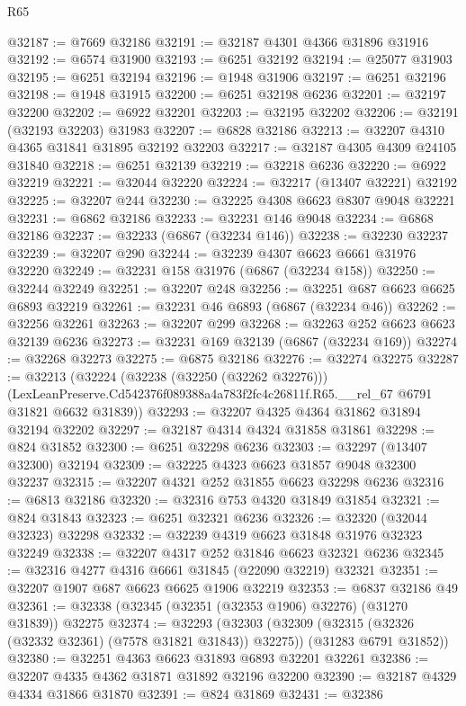 \begin{lexlean}{R65}
\begin{coremodule}
{@32187 := @7669 @32186
@32191 := @32187 @4301 @4366 @31896 @31916
@32192 := @6574 @31900
@32193 := @6251 @32192
@32194 := @25077 @31903
@32195 := @6251 @32194
@32196 := @1948 @31906
@32197 := @6251 @32196
@32198 := @1948 @31915
@32200 := @6251 @32198 @6236
@32201 := @32197 @32200
@32202 := @6922 @32201
@32203 := @32195 @32202
@32206 := @32191 (@32193 @32203) @31983
@32207 := @6828 @32186
@32213 := @32207 @4310 @4365 @31841 @31895 @32192 @32203
@32217 := @32187 @4305 @4309 @24105 @31840
@32218 := @6251 @32139
@32219 := @32218 @6236
@32220 := @6922 @32219
@32221 := @32044 @32220
@32224 := @32217 (@13407 @32221) @32192
@32225 := @32207 @244
@32230 := @32225 @4308 @6623 @8307 @9048 @32221
@32231 := @6862 @32186
@32233 := @32231 @146 @9048
@32234 := @6868 @32186
@32237 := @32233 (@6867 (@32234 @146))
@32238 := @32230 @32237
@32239 := @32207 @290
@32244 := @32239 @4307 @6623 @6661 @31976 @32220
@32249 := @32231 @158 @31976 (@6867 (@32234 @158))
@32250 := @32244 @32249
@32251 := @32207 @248
@32256 := @32251 @687 @6623 @6625 @6893 @32219
@32261 := @32231 @46 @6893 (@6867 (@32234 @46))
@32262 := @32256 @32261
@32263 := @32207 @299
@32268 := @32263 @252 @6623 @6623 @32139 @6236
@32273 := @32231 @169 @32139 (@6867 (@32234 @169))
@32274 := @32268 @32273
@32275 := @6875 @32186
@32276 := @32274 @32275
@32287 := @32213
    (@32224
      (@32238 (@32250 (@32262 @32276)))
      (LexLeanPreserve.Cd542376f089388a4a783f2fc4c26811f.R65.__rel_67 @6791 @31821 @6632 @31839))
@32293 := @32207 @4325 @4364 @31862 @31894 @32194 @32202
@32297 := @32187 @4314 @4324 @31858 @31861
@32298 := @824 @31852
@32300 := @6251 @32298 @6236
@32303 := @32297 (@13407 @32300) @32194
@32309 := @32225 @4323 @6623 @31857 @9048 @32300 @32237
@32315 := @32207 @4321 @252 @31855 @6623 @32298 @6236
@32316 := @6813 @32186
@32320 := @32316 @753 @4320 @31849 @31854
@32321 := @824 @31843
@32323 := @6251 @32321 @6236
@32326 := @32320 (@32044 @32323) @32298
@32332 := @32239 @4319 @6623 @31848 @31976 @32323 @32249
@32338 := @32207 @4317 @252 @31846 @6623 @32321 @6236
@32345 := @32316 @4277 @4316 @6661 @31845 (@22090 @32219) @32321
@32351 := @32207 @1907 @687 @6623 @6625 @1906 @32219
@32353 := @6837 @32186 @49
@32361 := @32338 (@32345 (@32351 (@32353 @1906) @32276) (@31270 @31839)) @32275
@32374 := @32293
    (@32303
      (@32309 (@32315 (@32326 (@32332 @32361) (@7578 @31821 @31843)) @32275))
      (@31283 @6791 @31852))
@32380 := @32251 @4363 @6623 @31893 @6893 @32201 @32261
@32386 := @32207 @4335 @4362 @31871 @31892 @32196 @32200
@32390 := @32187 @4329 @4334 @31866 @31870
@32391 := @824 @31869
@32431 := @32386
}
\end{coremodule}
\end{lexlean}
